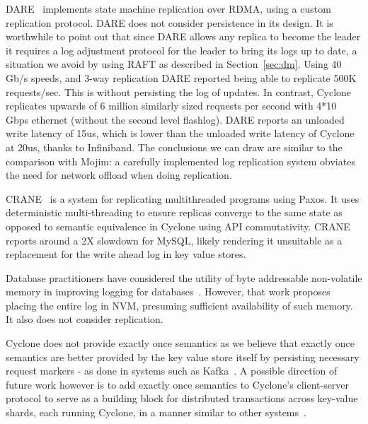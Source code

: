 \documentclass[twocolumn]{article}
\begin{document}
DARE~\cite{dare} implements state machine replication over RDMA, using a custom
replication protocol. DARE does not consider persistence in its design. It is
worthwhile to point out that since DARE allows any replica to become the leader
it requires a log adjustment protocol for the leader to bring its logs up to
date, a situation we avoid by using RAFT as described in
Section~\ref{sec:dm}. Using 40 Gb/s speeds, and 3-way replication DARE reported
being able to replicate 500K requests/sec. This is without persisting the log of
updates. In contrast, Cyclone replicates upwards of 6 million similarly sized
requests per second with 4*10 Gbps ethernet (without the second level
flashlog). DARE reports an unloaded write latency of 15us, which is lower than
the unloaded write latency of Cyclone at 20us, thanks to Infiniband. The
conclusions we can draw are similar to the comparison with Mojim: a carefully
implemented log replication system obviates the need for network offload when
doing replication.

{CRANE}~\cite{crane} is a system for replicating multithreaded programs using
Paxos. It uses deterministic multi-threading to ensure replicas converge to the
same state as opposed to semantic equivalence in Cyclone using API
commutativity.  CRANE reports around a 2X slowdown for MySQL, likely rendering
it unsuitable as a replacement for the write ahead log in key value stores.


Database practitioners have considered the utility of byte addressable
non-volatile memory in improving logging for
databases~\cite{nvram_log}. However, that work proposes placing the entire log
in NVM, presuming sufficient availability of such memory. It also does not
consider replication.

Cyclone does not provide exactly once semantics as we
believe that exactly once semantics are better provided by the key value store
itself by persisting necessary request markers - as done in systems such as
Kafka~\cite{kafka}. A possible direction of future work however is to add
exactly once semantics to Cyclone's client-server protocol to serve as a
building block for distributed transactions across key-value shards, each
running Cyclone, in a manner similar to other systems~\cite{raft_lin}.
\end{document}
